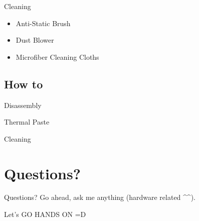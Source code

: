 \documentclass{beamer}
\begin{document}
\begin{frame}{Cleaning}
    \begin{itemize}
        \item Anti-Static Brush
        \item Dust Blower
        \item Microfiber Cleaning Cloths
    \end{itemize}
\end{frame}

\subsection{How to}

\begin{frame}{Disassembly}
\end{frame}

\begin{frame}{Thermal Paste}
\end{frame}

\begin{frame}{Cleaning}
\end{frame}

\section{Questions?}

\begin{frame}{Questions?}
    Go ahead, ask me anything (hardware related \textasciicircum \textasciicircum).
\end{frame}

\begin{frame}{Let's GO}
    HANDS ON =D
\end{frame}
\end{document}
